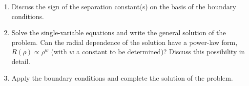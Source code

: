 \documentclass[fleqn]{article}
\begin{document}
\begin{enumerate}
\begin{enumerate}
          \item  Discuss the sign of the separation constant(s) on the basis of the boundary conditions. 
          
          \item Solve the single-variable equations and write the general solution of the problem.  Can the radial dependence of the solution have a power-law form, $R(\rho) \propto \rho^w $ (with $w$ a constant to be determined)?  Discuss this possibility in detail. 
          
          \item Apply the boundary conditions and complete the solution of the problem.
      \end{enumerate}
  
  \end{enumerate}

  \pagebreak
\end{document}
